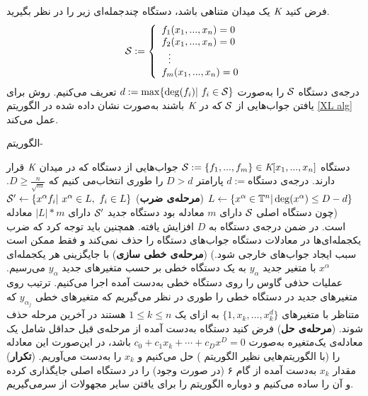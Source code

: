 فرض کنید 
$\textit{K}$
یک میدان متناهی باشد، دستگاه چندجمله‌ای زیر را در نظر بگیرید. 
$${\mathcal S}:= \left \{ \begin{array}{l}
f_{1}(x_{1},...,x_{n}) = 0\\
f_{2}(x_{1},...,x_{n}) = 0\\
\ \ \vdots\\
f_{m}(x_{1},...,x_{n}) = 0
\end{array} \right.$$
درجه‌ی دستگاه 
${\mathcal S}$
را به‌صورت 
$d:= \max\{\deg(f_{i})| \ f_{i}\in {\mathcal S}\}$
تعریف می‌کنیم. روش 
برای یافتن جواب‌هایی از 
${\mathcal S}$
که در 
$\textit{K}$
باشند به‌صورت نشان داده شده در   الگوریتم 
\ref{XL alg}
عمل می‌کند. 
\renewcommand{\algorithmicrequire}{\textbf{ورودی}}
\renewcommand{\algorithmicensure}{\textbf{خروجی}}
\begin{algorithm}[]
\caption{الگوریتم-
		}
\label{XL alg}	
	\begin{algorithmic}[1]				
		\REQUIRE دستگاه 
		${\mathcal S}:= \{f_{1},...,f_{m}\}\in \textit{K}[x_{1},...,x_{n}]$
		\ENSURE جواب‌هایی از دستگاه که در میدان 
	$\textit{K}$		 
	قرار دارند.
		\STATE $d:=\text{درجه‌ی دستگاه}$
		\STATE پارامتر 
		$D> d$		
		 را طوری انتخاب‌می کنیم که 
		 $D \geq \frac{n}{\sqrt{m}}$.
		\STATE $L\gets \{x^{\alpha}\in {\mathbb{T}}^{n}| \deg(x^{\alpha})\leq D - d\}$
	    \STATE (\textbf{مرحله‌ی ضرب}) $\mS'\gets \{x^{\alpha}f_{i}| \ x^{\alpha}\in L, \ f_{i}\in L\}$
	     {\footnotesize (چون دستگاه اصلی 
	    ${\mathcal S}$
	    دارای 
	    $m$
	    معادله بود دستگاه جدید 
	    ${\mathcal S}'$
	    دارای 
	    $|L|*m$
	    معادله است. در ضمن درجه‌ی دستگاه به 
	    $D$
	    افزایش یافته. همچنین باید توجه کرد که ضرب یکجمله‌ای‌ها در معادلات دستگاه جواب‌های دستگاه را حذف نمی‌کند و فقط ممکن است سبب ایجاد جواب‌های خارجی شود.)} 
	    \STATE (\textbf{مرحله‌ی خطی سازی})
	    با جایگزینی هر یکجمله‌ای  
	    $x^{\alpha}$
	    با متغیر جدید 
	    $y_{\alpha}$
	    به یک دستگاه خطی بر حسب متغیر‌های جدید 
	    $y_{\alpha}$
	    می‌رسیم. 
	عملیات حذفی گاوس را روی دستگاه خطی به‌دست  آمده اجرا می‌کنیم. ترتیب روی متغیرهای جدید در دستگاه خطی را طوری در نظر می‌گیریم که متغیر‌های خطی   
	    $y_{\alpha_{j}}$
	    که متناظر با متغیرهای 
	    $\{1, x_{k},...,x_{k}^{d}\}$
	    به ازای یک 
	    $1\leq k\leq n$
	    هستند در آخرین مرحله حذف شوند. 
	    \STATE (\textbf{مرحله‌ی حل})
	   فرض کنید دستگاه به‌دست  آمده از مرحله‌ی قبل حداقل شامل یک معادله‌ی یک‌متغیره به‌صورت 
	   $c_{0} + c_{1}x_{k} + \cdots + c_{D}x^{D} = 0$
	   باشد، در این‌صورت این معادله را (با الگوریتم‌هایی نظیر الگوریتم
	   )
	    حل می‌کنیم و 
	   $x_{k}$
	   را به‌دست  می‌آوریم. 
	   \STATE (\textbf{تکرار})
	   مقدار 
	   $x_{k}$
	   به‌دست  آمده  از گام  ۶ (در صورت وجود) را در دستگاه اصلی جایگذاری کرده و آن را ساده می‌کنیم و دوباره الگوریتم را برای یافتن سایر مجهولات  از سرمی‌گیریم. 
	\end{algorithmic}
\end{algorithm}

